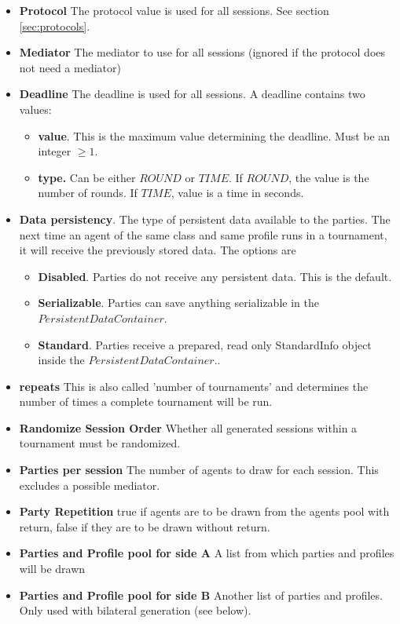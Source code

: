 \documentclass[]{article}
\begin{document}
\begin{itemize}
\item \textbf{Protocol} The protocol value is used for all sessions. See section \ref{sec:protocols}.
\item \textbf{Mediator} The mediator to use for all sessions (ignored if the protocol does not need a mediator)
\item \textbf{Deadline} The deadline is used for all sessions.  A deadline contains two values:
     \begin{itemize}
        \item \textbf{value}. This is the maximum value determining the deadline. Must be an integer $\ge 1$.
        \item \textbf{type.} Can be either $ROUND$ or $TIME$. If $ROUND$, the value is the number of rounds. If $TIME$, value is a time in seconds.
      \end{itemize}
\item \textbf{Data persistency}. The type of persistent data available to the parties. The next time an agent of the same class and same profile runs in a tournament, it will receive the previously stored data. The options are 
	\begin{itemize}
	\item \textbf{Disabled}. Parties do not receive any persistent data. This is the default.
	\item \textbf{Serializable}. Parties can save anything serializable in the $PersistentDataContainer$.
	\item \textbf{Standard}. Parties receive a prepared, read only StandardInfo object inside the $PersistentDataContainer$.. 
	\end{itemize}
\item \textbf{repeats} This is also called 'number of tournaments' and determines the number of times a complete tournament will be run.
\item \textbf{Randomize Session Order} Whether all generated sessions within a tournament must be randomized.
\item \textbf{Parties per session} The number of agents to draw for each session. This excludes a possible mediator.
\item \textbf{Party Repetition} true if agents are to be drawn from the agents pool with return, false if they are to be drawn without return.
\item \textbf{Parties and Profile pool for side A}  A list from which parties and profiles will be drawn
\item \textbf{Parties and Profile pool for side B} Another list of parties and profiles. Only used with bilateral generation (see below).
\end{itemize}
\end{document}
